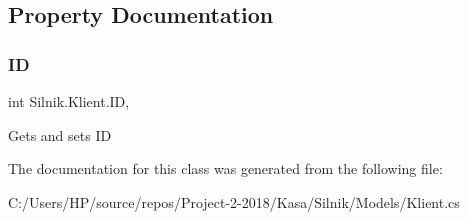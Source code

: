 \subsection{Property Documentation}
\mbox{\label{class_silnik_1_1_klient_ab301349e81e7495a1b07a1105d89e80b}} 
\subsubsection{\texorpdfstring{ID}{ID}}
{\footnotesize\ttfamily int Silnik.\+Klient.\+ID\hspace{0.3cm}{\ttfamily [get]}, {\ttfamily [set]}}



Gets and sets ID 



The documentation for this class was generated from the following file\+:\begin{DoxyCompactItemize}
\item 
C\+:/\+Users/\+H\+P/source/repos/\+Project-\/2-\/2018/\+Kasa/\+Silnik/\+Models/Klient.\+cs\end{DoxyCompactItemize}
